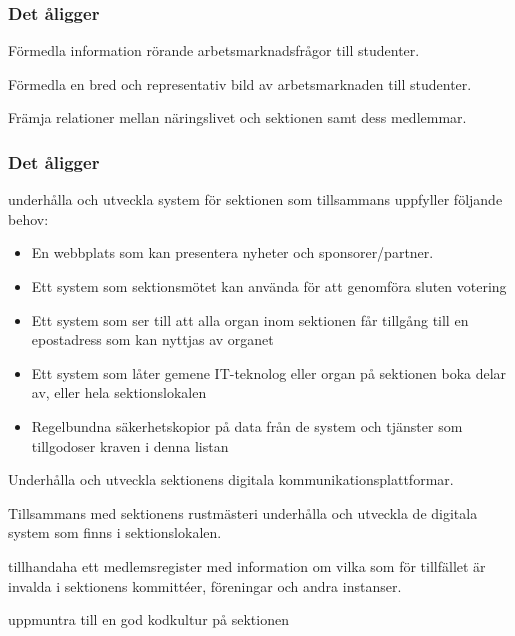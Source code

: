 \subsubsection{Det åligger \ARMIT{}}
\begin{att}
	\item Förmedla information rörande arbetsmarknadsfrågor till studenter.
	\item Förmedla en bred och representativ bild av arbetsmarknaden till studenter.
	\item Främja relationer mellan näringslivet och sektionen samt dess medlemmar.
\end{att}

\subsubsection{Det åligger \DIGIT}
\begin{att}
	\item underhålla och utveckla system för sektionen som tillsammans uppfyller följande behov:
	\begin{itemize}
		\item En webbplats som kan presentera nyheter och sponsorer/partner.
		\item Ett system som sektionsmötet kan använda för att genomföra sluten votering
		\item Ett system som ser till att alla organ inom sektionen får tillgång till en epostadress som kan nyttjas av organet
		\item Ett system som låter gemene IT-teknolog eller organ på sektionen boka delar av, eller hela sektionslokalen
		\item Regelbundna säkerhetskopior på data från de system och tjänster som tillgodoser kraven i denna listan
	\end{itemize}	
	\item Underhålla och utveckla sektionens digitala kommunikationsplattformar.
	\item Tillsammans med sektionens rustmästeri underhålla och utveckla de digitala system som finns i sektionslokalen.
	\item tillhandaha ett medlemsregister med information om vilka som för tillfället är invalda i sektionens kommittéer, föreningar och andra instanser.
	\item uppmuntra till en god kodkultur på sektionen
\end{att}


